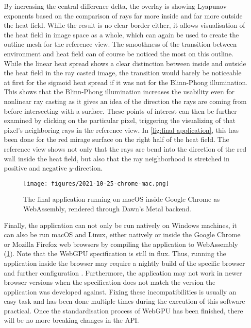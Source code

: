By increasing the central difference delta, the overlay is showing Lyapunov exponents based on the comparison of rays far more inside and far more outside the heat field.
While the result is no clear border either, it allows visualisation of the heat field in image space as a whole, which can again be used to create the outline mesh for the reference view.
The smoothness of the transition between environment and heat field can of course be noticed the most on this outline.
While the linear heat spread shows a clear distinction between inside and outside the heat field in the ray casted image, the transition would barely be noticeable at first for the sigmoid heat spread if it was not for the Blinn-Phong illumination.
This shows that the Blinn-Phong illumination increases the usability even for nonlinear ray casting as it gives an idea of the direction the rays are coming from before intersecting with a surface.
These points of interest can then be further examined by clicking on the particular pixel, triggering the visualizing of that pixel's neighboring rays in the reference view.
In \cref{fig:final application}, this has been done for the red mirage surface on the right half of the heat field.
The reference view shows not only that the rays are bend into the direction of the red wall inside the heat field, but also that the ray neighborhood is stretched in positive and negative $y$-direction.

\begin{figure}[!t]
  \centering
  \texttt{[image: figures/2021-10-25-chrome-mac.png]}
  \caption{The final application running on macOS inside Google Chrome as WebAssembly, rendered through Dawn's Metal backend.}
  \label{fig:chrome-mac}
\end{figure}
Finally, the application can not only be run natively on Windows machines, it can also be run macOS and Linux, either natively or inside the Google Chrome or Mozilla Firefox web browsers by compiling the application to WebAssembly (\cref{fig:chrome-mac}).
Note that the WebGPU specification is still in flux.
Thus, running the application inside the browser may require a nightly build of the specific browser and further configuration \cite{beaufortAccessModernGPU2021}.
Furthermore, the application may not work in newer browser versions when the specification does not match the version the application was developed against.
Fixing these incompatibilities is usually an easy task and has been done multiple times during the execution of this software practical.
Once the standardisation process of WebGPU has been finished, there will be no more breaking changes in the API.
